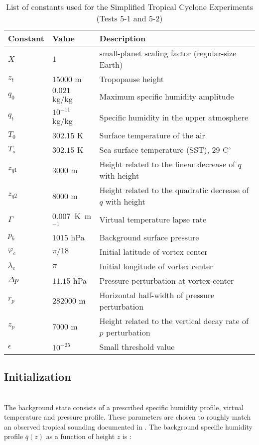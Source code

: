 \documentclass[times,doublespace]{fldauth}
\begin{document}
\begin{table}[h]

\caption{List of constants used for the Simplified Tropical Cyclone Experiments (Tests 5-1 and 5-2)}

\begin{tabular*}{\textwidth}{@{\extracolsep{\fill}}lll}
\hline Constant & Value & Description \\
\hline
$X$ & $1$ & small-planet scaling factor (regular-size Earth)\\
$z_t$ & $15000$ m & Tropopause height \\
$q_0$ & $0.021$ kg/kg & Maximum specific humidity amplitude \\
$q_t$ & $10^{-11}$ kg/kg & Specific humidity in the upper atmosphere \\
$T_0$ & $302.15$ K & Surface temperature of the air \\
$T_s$ & $302.15$ K & Sea surface temperature (SST), 29 C$^\circ$\\
$z_{q1}$ & $3000$ m & Height related to the linear decrease of $q$ with height \\
$z_{q2}$ & $8000$ m & Height related to the quadratic decrease of $q$ with height \\
$\Gamma$ & $0.007$\ K\ m$^{-1}$ & Virtual temperature lapse rate \\
$p_{b}$ & $1015$ hPa & Background surface pressure \\
$\varphi_c$ & $\pi / 18$ & Initial latitude of vortex center \\
$\lambda_c$ & $\pi$ & Initial longitude of vortex center \\
$\Delta p$ & $11.15$ hPa & Pressure perturbation at vortex center \\
$r_p$ & $282000$ m & Horizontal half-width of pressure perturbation \\
$z_p$ & $7000$ m & Height related to the vertical decay rate of $p$ perturbation \\
$\epsilon$ & $10^{-25}$ & Small threshold value \\
\hline 
\end{tabular*}

\end{table}


\subsection{ Initialization }


~\\ The background state consists of a prescribed specific humidity profile, virtual temperature and pressure profile.  These parameters are chosen to roughly match an observed tropical sounding documented in \cite{jordan:58}.  The background specific humidity profile $\overline{q}(z)$ as a function of height $z$ is :
\end{document}
